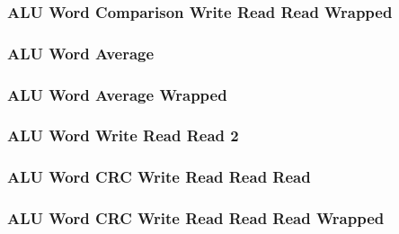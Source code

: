 \subsubsection[{\small ALU Word Comparison Write Read Read Wrapped}]{ALU Word Comparison Write Read Read Wrapped} \label{sec:format-ALU-WCWRR.W}



\subsubsection[{\small ALU Word Average}]{ALU Word Average} \label{sec:format-ALU-WAVG}



\subsubsection[{\small ALU Word Average Wrapped}]{ALU Word Average Wrapped} \label{sec:format-ALU-WAVG.W}



\subsubsection[{\small ALU Word Write Read Read 2}]{ALU Word Write Read Read 2} \label{sec:format-ALU-WWRR2}



\subsubsection[{\small ALU Word CRC Write Read Read Read}]{ALU Word CRC Write Read Read Read} \label{sec:format-ALU-WCWRRR}



\subsubsection[{\small ALU Word CRC Write Read Read Read Wrapped}]{ALU Word CRC Write Read Read Read Wrapped} \label{sec:format-ALU-WCWRRR.W}

